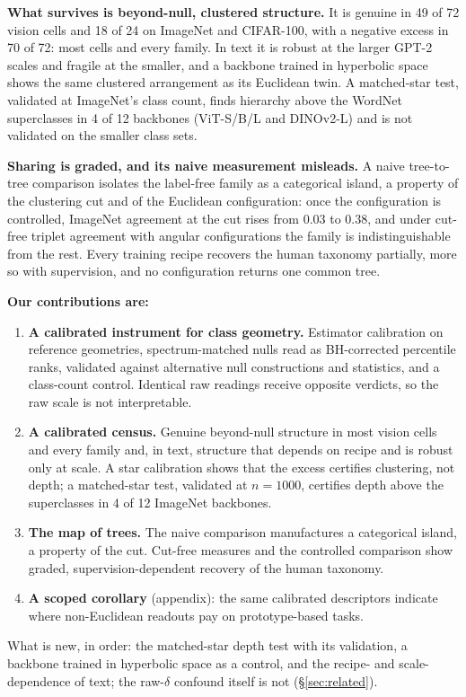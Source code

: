 \textbf{What survives is beyond-null, clustered structure.} It is genuine in 49 of 72 vision cells and 18 of 24 on ImageNet and CIFAR-100, with a negative excess in 70 of 72: most cells and every family. In text it is robust at the larger GPT-2 scales and fragile at the smaller, and a backbone trained in hyperbolic space shows the same clustered arrangement as its Euclidean twin. A matched-star test, validated at ImageNet's class count, finds hierarchy above the WordNet superclasses in 4 of 12 backbones (ViT-S/B/L and DINOv2-L) and is not validated on the smaller class sets. %

\textbf{Sharing is graded, and its naive measurement misleads.} A naive tree-to-tree comparison isolates the label-free family as a categorical island, a property of the clustering cut and of the Euclidean configuration: once the configuration is controlled, ImageNet agreement at the cut rises from $0.03$ to $0.38$, and under cut-free triplet agreement with angular configurations the family is indistinguishable from the rest. Every training recipe recovers the human taxonomy partially, more so with supervision, and no configuration returns one common tree. %

\textbf{Our contributions are:}
\begin{enumerate}[topsep=0pt,itemsep=1pt,leftmargin=*]
\item \textbf{A calibrated instrument for class geometry.} Estimator calibration on reference geometries, spectrum-matched nulls read as BH-corrected percentile ranks, validated against alternative null constructions and statistics, and a class-count control. Identical raw readings receive opposite verdicts, so the raw scale is not interpretable.
\item \textbf{A calibrated census.} Genuine beyond-null structure in most vision cells and every family and, in text, structure that depends on recipe and is robust only at scale. A star calibration shows that the excess certifies clustering, not depth; a matched-star test, validated at $n{=}1000$, certifies depth above the superclasses in 4 of 12 ImageNet backbones.
\item \textbf{The map of trees.} The naive comparison manufactures a categorical island, a property of the cut. Cut-free measures and the controlled comparison show graded, supervision-dependent recovery of the human taxonomy.
\item \textbf{A scoped corollary} (appendix): the same calibrated descriptors indicate where non-Euclidean readouts pay on prototype-based tasks.
\end{enumerate}
What is new, in order: the matched-star depth test with its validation, a backbone trained in hyperbolic space as a control, and the recipe- and scale-dependence of text; the raw-$\delta$ confound itself is not (\S\ref{sec:related}).


